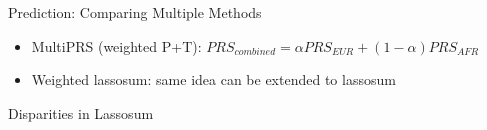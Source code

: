 \documentclass{beamer}
\begin{document}
\begin{frame}{Prediction: Comparing Multiple Methods}
\begin{figure}[h]	
\noindent{}
   \label{fig:methods comparison}
\end{figure}

\begin{itemize}
    \item MultiPRS (weighted P+T): $PRS_{combined} = \alpha PRS_{EUR} + (1-\alpha) PRS_{AFR}$
    \item Weighted lassosum: same idea can be extended to lassosum
\end{itemize}

\end{frame}


\begin{frame}{Disparities in Lassosum}

\begin{figure}[h]	
\noindent{}
   \label{fig:lassosum disparities}
\end{figure}

\end{frame}
\end{document}
